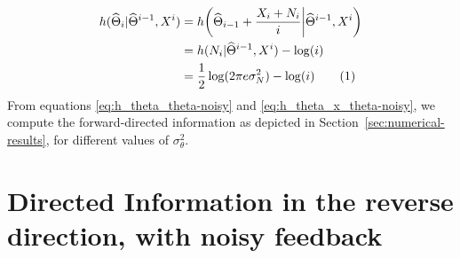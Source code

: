 \documentclass[letterpaper, 10pt, conference]{ieeeconf}
\newcommand\numberthis{\stepcounter{equation}\tag{\theequation}}
\begin{document}
\begin{align*}
	h(\widehat\Theta_i | \widehat\Theta^{i-1}, X^i) &= h \bigg( \widehat\Theta_{i-1} + \frac{X_i + N_i}{i} \bigg| \widehat\Theta^{i-1}, X^i \bigg) \\
													&= h(N_i | \widehat\Theta^{i-1}, X^i) -\log(i) \\
													&= \frac{1}{2}\log(2 \pi e \sigma_N^2) -\log(i) \numberthis \label{eq:h_theta_x_theta-noisy}
\end{align*}
From equations \eqref{eq:h_theta_theta-noisy} and \eqref{eq:h_theta_x_theta-noisy}, we compute the forward-directed information as depicted in Section~\ref{sec:numerical-results}, for different values of $\sigma_\theta^2$.

\section{Directed Information in the reverse direction, with noisy feedback}
\label{app:dir-info-rev-noisy}
\end{document}
